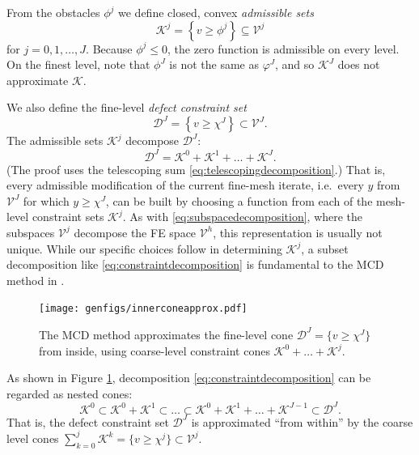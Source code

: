 \documentclass[letterpaper,final,12pt,reqno]{amsart}
\theoremstyle{claim}
\numberwithin{equation}{section}
\numberwithin{figure}{section}
\numberwithin{table}{section}
\numberwithin{theorem}{section}
\begin{document}
From the obstacles $\phi^j$ we define closed, convex \emph{admissible sets}
\begin{equation}
\mathcal{K}^j = \left\{v \ge \phi^j\right\} \subseteq \mathcal{V}^j \label{eq:defineKj}
\end{equation}
for $j=0,1,\dots,J$.  Because $\phi^j \le 0$, the zero function is admissible on every level.  On the finest level, note that $\phi^J$ is not the same as $\varphi^J$, and so $\mathcal{K}^J$ does not approximate $\mathcal{K}$.

We also define the fine-level \emph{defect constraint set}
\begin{equation}
  \mathcal{D}^J = \left\{v \ge \chi^J\right\} \subset \mathcal{V}^J.
\end{equation}
The admissible sets $\mathcal{K}^j$ decompose $\mathcal{D}^J$:
\begin{equation}
  \mathcal{D}^J = \mathcal{K}^0 + \mathcal{K}^1 + \dots + \mathcal{K}^J. \label{eq:constraintdecomposition}
\end{equation}
(The proof uses the telescoping sum \eqref{eq:telescopingdecomposition}.)  That is, every admissible modification of the current fine-mesh iterate, i.e.~every $y$ from $\mathcal{V}^J$ for which $y\ge \chi^J$, can be built by choosing a function from each of the mesh-level constraint sets $\mathcal{K}^j$.  As with \eqref{eq:subspacedecomposition}, where the subspaces $\mathcal{V}^j$ decompose the FE space $\mathcal{V}^h$, this representation is usually not unique.  While our specific choices follow \cite{GraeserKornhuber2009} in determining $\mathcal{K}^j$, a subset decomposition like \eqref{eq:constraintdecomposition} is fundamental to the MCD method in \cite{Tai2003}.

\begin{figure}
\texttt{[image: genfigs/innerconeapprox.pdf]}

\caption{The MCD method approximates the fine-level cone $\mathcal{D}^J = \{v\ge \chi^J\}$ from inside, using coarse-level constraint cones $\mathcal{K}^0+\dots+\mathcal{K}^j$.}
\label{fig:innerconeapprox}
\end{figure}

As shown in Figure \ref{fig:innerconeapprox}, decomposition \eqref{eq:constraintdecomposition} can be regarded as nested cones:
\begin{equation}
  \mathcal{K}^0 \subset \mathcal{K}^0 + \mathcal{K}^1 \subset \dots \subset \mathcal{K}^0 + \mathcal{K}^1 + \dots + \mathcal{K}^{J-1} \subset \mathcal{D}^J.  \label{eq:nestedcones}
\end{equation}
That is, the defect constraint set $\mathcal{D}^J$ is approximated ``from within'' by the coarse level cones $\sum_{k=0}^j \mathcal{K}^k = \{v \ge \chi^j\} \subset \mathcal{V}^j$.
\end{document}
